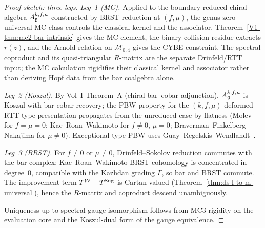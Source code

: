 \begin{proof}[Proof sketch: three legs]
\emph{Leg~1 (MC).} Applied to the boundary-reduced chiral algebra
$A_{\mathfrak{g}}^{k,f,\mu}$ constructed by BRST reduction at $(f,\mu)$, the
genus-zero universal MC class controls the classical kernel and the
associator. Theorem~\ref*{V1-thm:mc2-bar-intrinsic} gives the MC
element, the binary collision residue extracts $r(z)$, and the Arnold
relation on $\overline{\mathcal{M}}_{0,4}$ gives the CYBE constraint.
The spectral coproduct and its quasi-triangular $R$-matrix are the
separate Drinfeld/RTT input; the MC calculation rigidifies their
classical kernel and associator rather than deriving Hopf data from
the bar coalgebra alone.

\emph{Leg~2 (Koszul).} By Vol~I Theorem~A (chiral bar--cobar
adjunction), $A_{\mathfrak{g}}^{k,f,\mu}$ is Koszul with bar-cobar recovery; the
PBW property for the $(k,f,\mu)$-deformed RTT-type presentation
propagates from the unreduced case by flatness (Molev for $f=\mu=0$;
Kac--Roan--Wakimoto for $f\ne 0$, $\mu=0$;
Braverman--Finkelberg--Nakajima for $\mu\ne 0$). Exceptional-type PBW
uses Guay--Regelskis--Wendlandt~\cite{GRW18}.

\emph{Leg~3 (BRST).} For $f\ne 0$ or $\mu\ne 0$, Drinfeld--Sokolov
reduction commutes with the bar complex: Kac--Roan--Wakimoto BRST
cohomology is concentrated in degree~$0$, compatible with the
Kazhdan grading $\Gamma$, so bar and BRST commute. The improvement
term $T^{\mathcal{W}}-T^{\mathrm{Sug}}$ is Cartan-valued
(Theorem~\ref{thm:ds-l-to-m-universal}), hence the $R$-matrix and
coproduct descend unambiguously.

Uniqueness up to spectral gauge isomorphism follows from MC3
rigidity on the evaluation core and the Koszul-dual form of the
gauge equivalence.
\end{proof}

